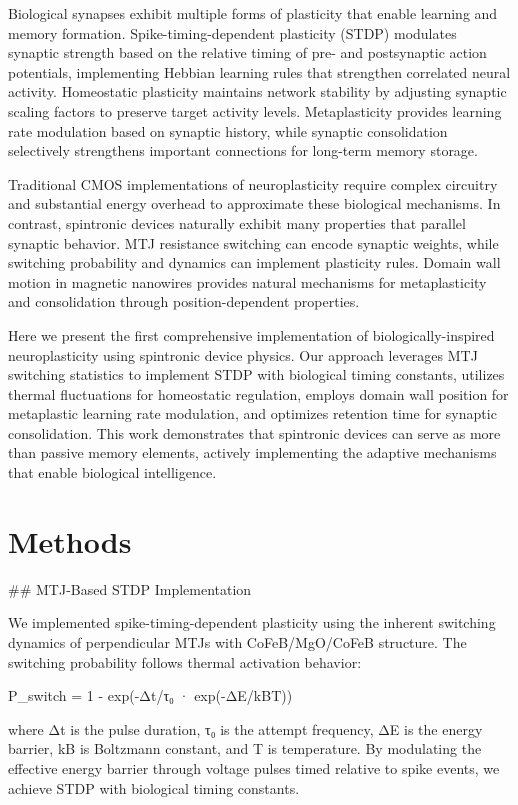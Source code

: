 \documentclass[two_column,11pt]{article}
\begin{document}
        Biological synapses exhibit multiple forms of plasticity that enable learning and memory formation. Spike-timing-dependent plasticity (STDP) modulates synaptic strength based on the relative timing of pre- and postsynaptic action potentials, implementing Hebbian learning rules that strengthen correlated neural activity. Homeostatic plasticity maintains network stability by adjusting synaptic scaling factors to preserve target activity levels. Metaplasticity provides learning rate modulation based on synaptic history, while synaptic consolidation selectively strengthens important connections for long-term memory storage.
        
        Traditional CMOS implementations of neuroplasticity require complex circuitry and substantial energy overhead to approximate these biological mechanisms. In contrast, spintronic devices naturally exhibit many properties that parallel synaptic behavior. MTJ resistance switching can encode synaptic weights, while switching probability and dynamics can implement plasticity rules. Domain wall motion in magnetic nanowires provides natural mechanisms for metaplasticity and consolidation through position-dependent properties.
        
        Here we present the first comprehensive implementation of biologically-inspired neuroplasticity using spintronic device physics. Our approach leverages MTJ switching statistics to implement STDP with biological timing constants, utilizes thermal fluctuations for homeostatic regulation, employs domain wall position for metaplastic learning rate modulation, and optimizes retention time for synaptic consolidation. This work demonstrates that spintronic devices can serve as more than passive memory elements, actively implementing the adaptive mechanisms that enable biological intelligence.
        

\section{Methods}

        ## MTJ-Based STDP Implementation
        
        We implemented spike-timing-dependent plasticity using the inherent switching dynamics of perpendicular MTJs with CoFeB/MgO/CoFeB structure. The switching probability follows thermal activation behavior:
        
        P_switch = 1 - exp(-Δt/τ₀ · exp(-ΔE/kBT))
        
        where Δt is the pulse duration, τ₀ is the attempt frequency, ΔE is the energy barrier, kB is Boltzmann constant, and T is temperature. By modulating the effective energy barrier through voltage pulses timed relative to spike events, we achieve STDP with biological timing constants.
        
\end{document}
